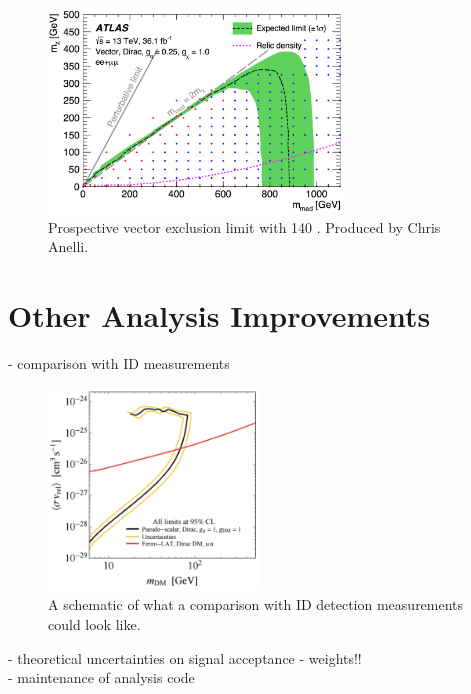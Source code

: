 \begin{figure}[htb]
\centering
\includegraphics[width=0.7\textwidth]{Figures/140ifb.png}
\caption{Prospective vector exclusion limit with 140 \ifb. Produced by Chris Anelli.}
\label{fig:id}
\end{figure}

\section{Other Analysis Improvements}

- comparison with ID measurements\\

\begin{figure}[htb]
\centering
\includegraphics[width=0.5\textwidth]{Figures/id.png}
\caption{A schematic of what a comparison with ID detection measurements could look like.}
\label{fig:id}
\end{figure}

- theoretical uncertainties on signal acceptance - weights!! \\
- maintenance of analysis code\\